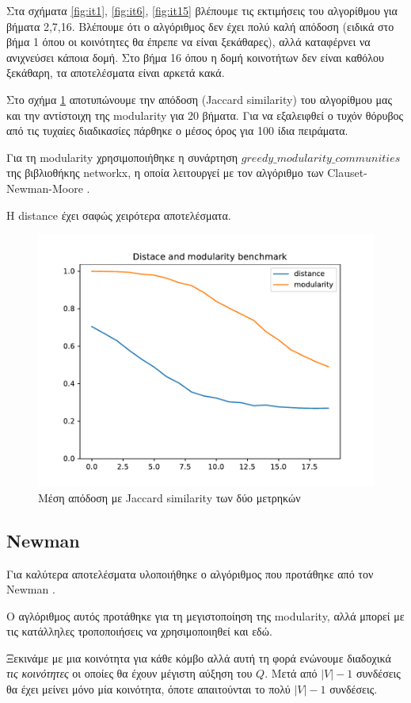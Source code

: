 \documentclass[12pt, letterpaper]{article}
\newcommand{\en}{\selectlanguage{english}}
\newcommand{\gr}{\selectlanguage{greek}}
\begin{document}
Στα σχήματα \ref{fig:it1}, \ref{fig:it6}, \ref{fig:it15} βλέπουμε τις εκτιμήσεις του 
αλγορίθμου για βήματα 2,7,16. Βλέπουμε ότι ο αλγόριθμος δεν έχει πολύ καλή απόδοση 
(ειδικά στο βήμα 1 όπου οι κοινότητες θα έπρεπε να είναι ξεκάθαρες), αλλά καταφέρνει 
να ανιχνεύσει κάποια δομή. Στο βήμα 16 όπου η δομή κοινοτήτων δεν είναι καθόλου ξεκάθαρη, 
τα αποτελέσματα είναι αρκετά κακά.

Στο σχήμα \ref{bench1} αποτυπώνουμε την απόδοση (\textlatin{Jaccard similarity})
του αλγορίθμου μας και την αντίστοιχη της \textlatin{modularity} για 20 βήματα.  
Για να εξαλειφθεί ο τυχόν θόρυβος από τις τυχαίες διαδικασίες πάρθηκε ο μέσος όρος 
για 100 ίδια πειράματα. 

Για τη \textlatin{modularity} χρησιμοποιήθηκε η συνάρτηση $greedy\_modularity\_communities$ της 
βιβλιοθήκης \textlatin{networkx}, η οποία λειτουργεί με τον αλγόριθμο των \en Clauset-Newman-Moore \gr 
\cite{Clauset:fastgreedy}\relax.
 
Η \textlatin{distance} έχει σαφώς χειρότερα αποτελέσματα.


\begin{figure}
  \centering
  \includegraphics[width=0.5\linewidth]{benchmark.pdf}
  \caption{Μέση απόδοση με \textlatin{Jaccard similarity} των δύο μετρηκών}
  \label{bench1}
\end{figure}


\subsection{\textlatin{Newman}}

Για καλύτερα αποτελέσματα υλοποιήθηκε ο αλγόριθμος που προτάθηκε από τον \textlatin{Newman} 
\cite{Newman}\relax. 

Ο αγλόριθμος αυτός προτάθηκε για τη μεγιστοποίηση της \en modularity, \gr αλλά μπορεί με τις κατάλληλες τροποποιήσεις να χρησιμοποιηθεί και εδώ.

Ξεκινάμε με μια κοινότητα για κάθε κόμβο αλλά αυτή τη φορά ενώνουμε διαδοχικά \emph{τις κοινότητες} οι οποίες θα έχουν μέγιστη αύξηση του $Q$. Μετά από $|V|-1$ συνδέσεις
θα έχει μείνει μόνο μία κοινότητα, όποτε απαιτούνται το πολύ $|V|-1$ συνδέσεις. 
\end{document}

